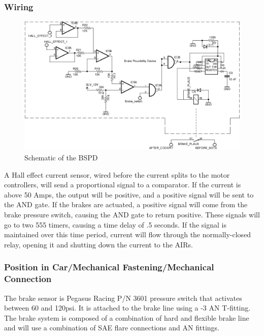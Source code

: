 \documentclass{article}
\begin{document}
        \subsubsection{Wiring}

            \begin{figure}[H]
                \centering
                \includegraphics[width = 0.9 \textwidth]{BSPD}
                \caption{Schematic of the BSPD}
                \label{BSPDschem}
            \end{figure}

A Hall effect current sensor, wired before the current splits to the motor controllers, will send a proportional signal to a comparator. If the current is above 50 Amps, the output will be positive, and a positive signal will be sent to the AND gate. If the brakes are actuated, a positive signal will come from the brake pressure switch, causing the AND gate to return positive. These signals will go to two 555 timers, causing a time delay of .5 seconds. If the signal is maintained over this time period, current will flow through the normally-closed relay, opening it and shutting down the current to the AIRs. 


        \subsubsection{Position in Car/Mechanical Fastening/Mechanical Connection}
 The brake sensor is Pegasus Racing P/N 3601 pressure switch that activates between 60 and 120psi. It is attached to the brake line using a -3 AN T-fitting. The brake system is composed of a combination of hard and flexible brake line and will use a combination of SAE flare connections and AN fittings.
\end{document}
